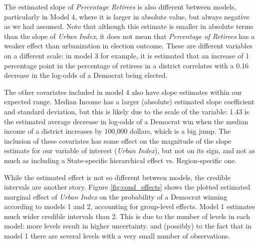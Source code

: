 \documentclass[12pt]{article}
\begin{document}
The estimated slope of \textit{Percentage Retirees} is also different between models, particularly in Model 4, where it is larger in absolute value, but always negative as we had assumed. Note that although this estimate is smaller in absolute terms than the slope of \textit{Urban Index}, it does not mean that \textit{Percentage of Retirees} has a weaker effect than urbanization in election outcome. These are different variables on a different scale: in model 3 for example, it is estimated that an increase of 1 percentage point in the percentage of retirees in a district correlates with a 0.16 decrease in the log-odds of a Democrat being elected.

The other covariates included in model 4 also have slope estimates within our expected range.
Median Income has a larger (absolute) estimated slope coefficient and standard deviation, but this is likely due to the scale of the variable: 1.43 is the estimated average decrease in log-odds of a Democrat win when the median income of a district increases by 100,000 dollars, which is a big jump. The inclusion of these covariates has some effect on the magnitude of the slope estimate for our variable of interest (\textit{Urban Index}), but not on its sign, and not as much as including a State-specific hierarchical effect vs. Region-specific one.




While the estimated effect is not so different between models, the credible intervals are another story. Figure \ref{fig:cond_effects} shows the plotted estimated marginal effect of \textit{Urban Index} on the probability of a Democrat winning according to models 1 and 2, accounting for group-level effects. Model 1 estimates much wider credible intervals than 2. This is due to the number of levels in each model: more levels result in higher uncertainty.
and (possibly) to the fact that in model 1 there are several levels with a very small number of observations.
\end{document}

